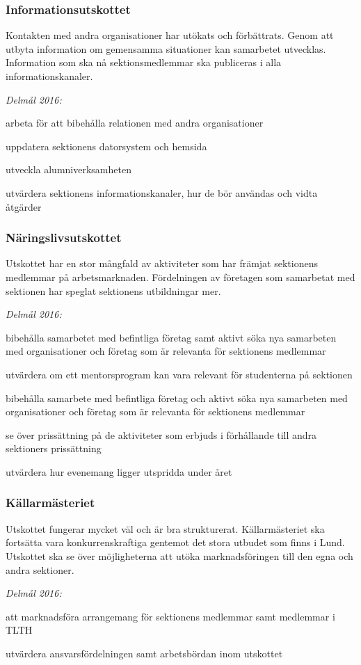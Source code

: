 \documentclass[../_main/handlingar.tex]{subfiles}
\begin{document}
\subsubsection*{Informationsutskottet}
Kontakten med andra organisationer har utökats och förbättrats. Genom att utbyta information om gemensamma situationer kan samarbetet utvecklas. Information som ska nå sektionsmedlemmar ska publiceras i alla informationskanaler.

\emph{Delmål 2016:}
\begin{dashlist}
    \item arbeta för att bibehålla relationen med andra organisationer
    \item uppdatera sektionens datorsystem och hemsida
    \item utveckla alumniverksamheten
    \item utvärdera sektionens informationskanaler, hur de bör användas och vidta åtgärder
\end{dashlist}

\subsubsection*{Näringslivsutskottet}
Utskottet har en stor mångfald av aktiviteter som har främjat sektionens medlemmar på arbetsmarknaden. Fördelningen av företagen som samarbetat med sektionen har speglat sektionens utbildningar mer.

\emph{Delmål 2016:}
\begin{dashlist}
    \item bibehålla samarbetet med befintliga företag samt aktivt söka nya samarbeten med organisationer och företag som är relevanta för sektionens medlemmar
    \item utvärdera om ett mentorsprogram kan vara relevant för studenterna på sektionen
    \item bibehålla samarbete med befintliga företag och aktivt söka nya samarbeten med organisationer och företag som är relevanta för sektionens medlemmar
    \item se över prissättning på de aktiviteter som erbjuds i förhållande till andra sektioners prissättning
    \item utvärdera hur evenemang ligger utspridda under året
\end{dashlist}

\subsubsection*{Källarmästeriet}
Utskottet fungerar mycket väl och är bra strukturerat. Källarmästeriet ska fortsätta vara konkurrenskraftiga gentemot det stora utbudet som finns i Lund. Utskottet ska se över möjligheterna att utöka marknadsföringen till den egna och andra sektioner.

\emph{Delmål 2016:}
\begin{dashlist}
    \item att marknadsföra arrangemang för sektionens medlemmar samt medlemmar i TLTH
    \item utvärdera ansvarsfördelningen samt arbetsbördan inom utskottet
\end{dashlist}

\newpage
\end{document}
